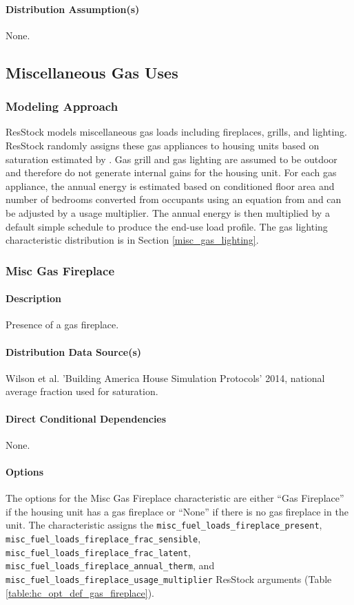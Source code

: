 \paragraph{Distribution Assumption(s)}
None.

\subsection{Miscellaneous Gas Uses}
\subsubsection{Modeling Approach}
ResStock models miscellaneous gas loads including fireplaces, grills, and lighting. ResStock randomly assigns these gas appliances to housing units based on saturation estimated by \citet{bahsp_2014}.  Gas grill and gas lighting are assumed to be outdoor and therefore do not generate internal gains for the housing unit. For each gas appliance, the annual energy is estimated based on conditioned floor area and number of bedrooms converted from occupants using an equation from \citet{bahsp_2010} and can be adjusted by a usage multiplier. The annual energy is then multiplied by a default simple schedule to produce the end-use load profile. The gas lighting characteristic distribution is in Section \ref{misc_gas_lighting}.

\subsubsection{Misc Gas Fireplace}
\paragraph{Description}
Presence of a gas fireplace.

\paragraph{Distribution Data Source(s)}
Wilson et al. 'Building America House Simulation Protocols' 2014, national average fraction used for saturation.

\paragraph{Direct Conditional Dependencies}
None.

\paragraph{Options}
The options for the Misc Gas Fireplace characteristic are either ``Gas Fireplace'' if the housing unit has a gas fireplace or ``None'' if there is no gas fireplace in the unit. The characteristic assigns the \texttt{misc\_fuel\_loads\_fireplace\_present}, \texttt{misc\_fuel\_loads\_fireplace\_frac\_sensible}, \texttt{misc\_fuel\_loads\_fireplace\_frac\_latent}, \texttt{misc\_fuel\_loads\_fireplace\_annual\_therm}, and \texttt{misc\_fuel\_loads\_fireplace\_usage\_multiplier} ResStock arguments (Table \ref{table:hc_opt_def_gas_fireplace}). 

